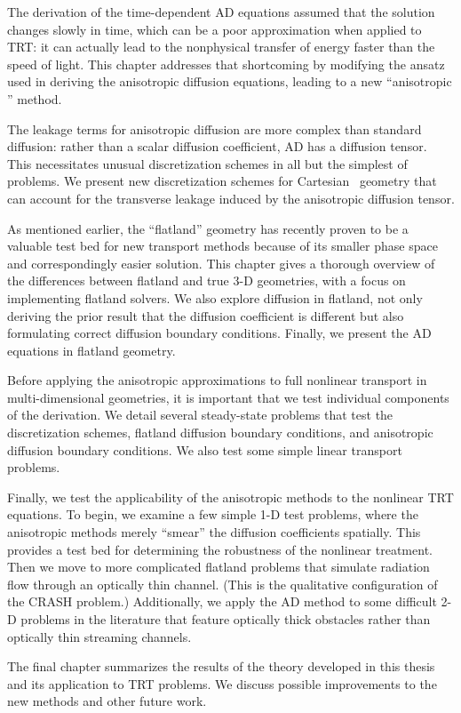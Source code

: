 The derivation of the time-dependent AD equations assumed that the solution
changes slowly in time, which can be a poor approximation when applied to
TRT: it can actually lead to the nonphysical transfer of energy faster than the
speed of
light. This chapter addresses that shortcoming by modifying the ansatz used in
deriving the anisotropic diffusion equations, leading to a new ``anisotropic
\Pone'' method.

The leakage terms for anisotropic diffusion are more complex than standard
diffusion: rather than a scalar diffusion coefficient, AD has a diffusion
tensor. This necessitates unusual discretization schemes in all but the simplest
of problems. We present new discretization schemes for Cartesian \xy\ geometry
that can account for the transverse leakage induced by the anisotropic diffusion
tensor.

As mentioned earlier, the ``flatland'' geometry has recently proven to be a
valuable test bed for new transport methods because of its smaller phase space
and correspondingly easier solution. This chapter gives a thorough overview of
the differences between flatland and true 3-D geometries, with a focus on
implementing flatland solvers. We also explore diffusion in flatland, not only
deriving the prior result that the diffusion coefficient is different but also
formulating correct diffusion boundary conditions. Finally, we present the AD
equations in flatland geometry.

Before applying the anisotropic approximations to full nonlinear transport in
multi-dimensional geometries, it is important that we test individual components
of the derivation. We detail several steady-state problems that test the
discretization schemes, flatland diffusion boundary conditions, and anisotropic
diffusion boundary conditions. We also test some simple linear transport
problems.

Finally, we test the applicability of the anisotropic methods to the nonlinear
TRT equations. To begin, we examine a few simple 1-D test problems, where the
anisotropic methods merely ``smear'' the diffusion coefficients spatially.
This provides a test bed for determining the robustness of the nonlinear
treatment. Then
we move to more complicated flatland problems that simulate radiation flow
through an optically thin channel. (This is the qualitative configuration of
the CRASH problem.)
Additionally, we apply the AD method to some difficult 2-D problems in the
literature that feature optically thick obstacles rather than optically thin
streaming channels.

The final chapter summarizes the results of the theory developed in this thesis
and its application to TRT problems. We discuss possible improvements to the new
methods and other future work.

